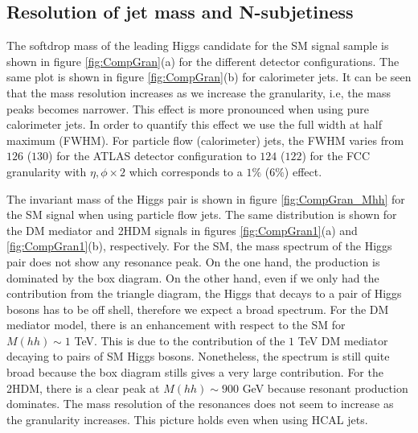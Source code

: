 \subsection{Resolution of jet mass and N-subjetiness}
\label{sec:res}

The softdrop mass of the leading Higgs candidate for the SM signal sample is shown in figure \ref{fig:CompGran}(a) for the different detector configurations. The same plot is shown in figure \ref{fig:CompGran}(b) for calorimeter jets. It can be seen that the mass resolution increases as we increase the granularity, i.e, the mass peaks becomes narrower. This effect is more pronounced when using pure calorimeter jets. In order to quantify this effect we use the full width at half maximum (FWHM). For particle flow (calorimeter) jets, the FWHM varies from $126$ ($130$) for the ATLAS detector configuration to $124$ ($122$) for the FCC granularity with $\eta,\phi\times 2$ which corresponds to a $1\%$ ($6\%$) effect.

The invariant mass of the Higgs pair is shown in figure \ref{fig:CompGran_Mhh} for the SM signal when using particle flow jets. The same distribution is shown for the DM mediator and 2HDM signals in figures \ref{fig:CompGran1}(a) and \ref{fig:CompGran1}(b), respectively. For the SM, the mass spectrum of the Higgs pair does not show any resonance peak. On the one hand, the production is dominated by the box diagram. On the other hand, even if we only had the contribution from the triangle diagram, the Higgs that decays to a pair of Higgs bosons has to be off shell, therefore we expect a broad spectrum. For the DM mediator model, there is an enhancement with respect to the SM for $M(hh)\sim 1$ TeV. This is due to the contribution of the $1$ TeV DM mediator decaying to pairs of SM Higgs bosons. Nonetheless, the spectrum is still quite broad because the box diagram stills gives a very large contribution. For the 2HDM, there is a clear peak at $M(hh)\sim 900$ GeV because resonant production dominates. The mass resolution of the resonances does not seem to increase as the granularity increases. This picture holds even when using HCAL jets.


